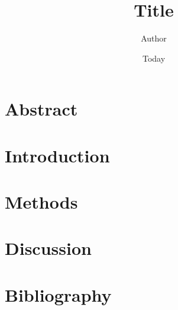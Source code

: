 \documentclass[]{article}
\begin{document}
\title{Title}
\author{Author}
\date{Today}
\maketitle

\section*{Abstract}

\section*{Introduction}

\section*{Methods}

\section*{Discussion}

\section*{Bibliography}




\end{document}

